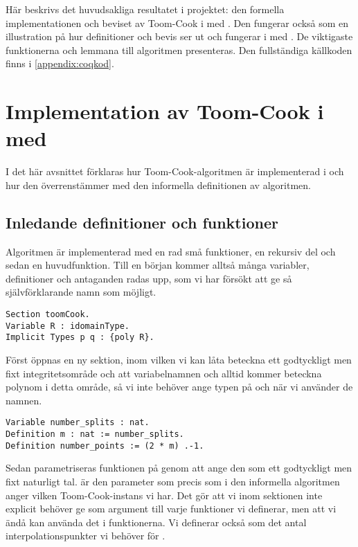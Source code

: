 Här beskrivs det huvudsakliga resultatet i projektet: den formella
implementationen och beviset av Toom-Cook i \coq{} med \ssr{}. Den fungerar
också som en illustration på hur definitioner och bevis ser ut och fungerar i
\coq{} med \ssr{}. De viktigaste funktionerna och lemmana till algoritmen
presenteras. Den fullständiga källkoden finns i \ref{appendix:coqkod}.

\section{Implementation av Toom-Cook i \coq{} med \ssr{}}
\label{sec:formellimplementation}
I det här avsnittet förklaras hur Toom-Cook-algoritmen är implementerad i
\ssr{} och hur den överrenstämmer med den informella definitionen av
algoritmen.

\subsection{Inledande definitioner och funktioner}
\label{section:forminl}
Algoritmen är implementerad med en rad små funktioner, en rekursiv del och
sedan en huvudfunktion. Till en början kommer alltså många variabler,
definitioner och antaganden radas upp, som vi har försökt att ge så
självförklarande namn som möjligt.

\begin{lstlisting}
Section toomCook.
Variable R : idomainType.
Implicit Types p q : {poly R}.
\end{lstlisting}

Först öppnas en ny sektion, inom vilken vi kan låta  beteckna ett
godtyckligt men fixt integritetsområde och att variabelnamnen  och 
alltid kommer beteckna polynom i detta område, så vi inte behöver ange typen på
 och  när vi använder de namnen.

\begin{lstlisting}
Variable number_splits : nat.
Definition m : nat := number_splits.
Definition number_points := (2 * m) .-1.
\end{lstlisting}

Sedan parametriseras funktionen på  genom att ange den som ett godtyckligt
men fixt naturligt tal.  är den parameter som precis som i den informella
algoritmen anger vilken Toom-Cook-instans vi har. Det gör att vi inom sektionen
inte explicit behöver ge  som argument till varje funktioner vi definerar,
men att vi ändå kan använda det i funktionerna. Vi definerar också
 som det antal interpolationspunkter vi behöver för \toomm{}.

